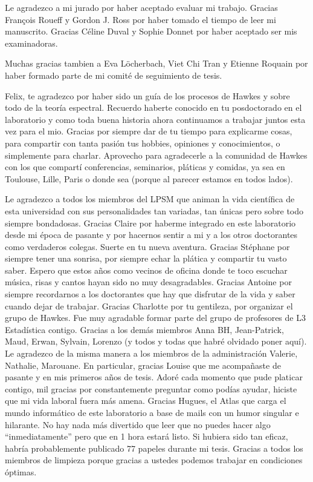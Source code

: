 Le agradezco a mi jurado por haber aceptado evaluar mi trabajo. Gracias François Roueff y Gordon J. Ross por haber tomado el tiempo de leer mi manuscrito. Gracias Céline Duval y Sophie Donnet por haber aceptado ser mis examinadoras.

Muchas gracias tambien a Eva Löcherbach, Viet Chi Tran y Etienne Roquain por haber formado parte de mi comité de seguimiento de tesis.

Felix, te agradezco por haber sido un guía de los procesos de Hawkes y sobre todo de la teoría espectral. Recuerdo haberte conocido en tu posdoctorado en el laboratorio y como toda buena historia ahora continuamos a trabajar juntos esta vez para el mio. Gracias por siempre dar de tu tiempo para explicarme cosas, para compartir con tanta pasión tus hobbies, opiniones y conocimientos, o simplemente para charlar.
Aprovecho para agradecerle a la comunidad de Hawkes con los que compartí conferencias, seminarios, pláticas y comidas, ya sea en Toulouse, Lille, Paris o donde sea (porque al parecer estamos en todos lados).

Le agradezco a todos los miembros del LPSM que animan la vida científica de esta universidad con sus personalidades tan variadas, tan únicas pero sobre todo siempre bondadosas. Gracias Claire por haberme integrado en este laboratorio desde mi época de pasante y por hacernos sentir a mi y a los otros doctorantes como verdaderos colegas. Suerte en tu nueva aventura. Gracias Stéphane por siempre tener una sonrisa, por siempre echar la plática y compartir tu vasto saber. Espero que estos años como vecinos de oficina donde te toco escuchar música, risas y cantos hayan sido no muy desagradables. Gracias Antoine por siempre recordarnos a los doctorantes que hay que disfrutar de la vida y saber cuando dejar de trabajar. Gracias Charlotte por tu gentileza, por organizar el grupo de Hawkes. Fue muy agradable formar parte del grupo de profesores de L3 Estadística contigo. Gracias a los demás miembros Anna BH, Jean-Patrick, Maud, Erwan, Sylvain, Lorenzo (y todos y todas que habré olvidado poner aquí). 
Le agradezco de la misma manera a los miembros de la administración Valerie,  Nathalie, Marouane. En particular, gracias Louise que me acompañaste de pasante y en mis primeros años de tesis. Adoré cada momento que pude platicar contigo, mil gracias por constantemente preguntar como podías ayudar, hiciste que mi vida laboral fuera más amena. Gracias Hugues, el Atlas que carga el mundo informático de este laboratorio a base de mails con un humor singular e hilarante. No hay nada más divertido que leer que no puedes hacer algo “inmediatamente” pero que en 1 hora estará listo. Si hubiera sido tan eficaz, habría probablemente publicado 77 papeles durante mi tesis. Gracias a todos los miembros de limpieza porque gracias a ustedes podemos trabajar en condiciones óptimas.

